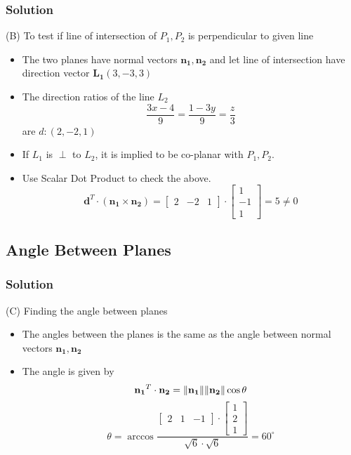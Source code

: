 \documentclass{beamer}
\let\vec\mathbf
\begin{document}
\begin{frame}
\frametitle{Solution}

(B) To test if line of intersection of $P_{1},P_{2}$ is perpendicular to given line 
\begin{itemize}
\item The two planes have normal vectors $\vec{n_{1}},\vec{n_{2}}$ and let line of intersection have direction vector $\vec{L_{1}}(3,-3,3)$
\item The direction ratios of the line $L_{2}$
\[
    \frac{3x-4}{9} = \frac{1-3y}{9}=\frac{z}{3}
\] are $d: (2,-2,1)$
\item If $L_{1}$ is $\perp$ to $L_{2}$, it is implied to be co-planar with $P_{1},P_{2}$.
\item Use Scalar Dot Product to check the above.
    \[
         \vec{d}^{T}\cdot(\vec{n_{1}}\times \vec{n_{2}})=
        \begin{bmatrix}
        2 & -2 & 1
        \end{bmatrix}
        \cdot
        \begin{bmatrix}
        1\\-1\\ 1
        \end{bmatrix}
        = 5 \neq 0
    \]
\end{itemize}
\end{frame}
 
 \subsection{Angle Between Planes}
\begin{frame}
\frametitle{Solution}

(C) Finding the angle between planes
\begin{itemize}
\item The angles between the planes is the same as the angle between normal vectors $\vec{n_{1}},\vec{n_{2}}$
\item The angle is given by
    \[
    \vec{n_{1}}^{T}\cdot\vec{n_{2}} =\norm{\vec{n_{1}}} \norm{\vec{n_{2}}} \cos \theta
    \]
    \[
    \theta = \arccos{\frac{\begin{bmatrix}2 & 1 & -1\end{bmatrix}\cdot \begin{bmatrix}1\\2\\1\end{bmatrix}}{\sqrt{6}\cdot\sqrt{6}}} = 60^\circ
    \]
    
    
\end{itemize}
\end{frame}
\end{document}
